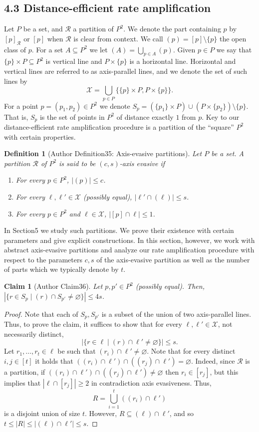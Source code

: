 \documentclass[10pt,a4paper]{article}
\newtheorem{ntdefinition}[nttheorem]{Definition}
\newtheorem{ntclaim}[nttheorem]{Claim}
\begin{document}
\subsection*{4.3 Distance-efficient rate amplification}
Let $P$ be a set, and $\mathcal R$ a partition of $P^2$. We denote the part containing $p$ by $[p]_{\mathcal R}$ or $[p]$ when $\mathcal R$ is clear from context. We call $(p)=[p]\setminus\{p\}$ the open class of $p$. For a set $A\subseteq P^2$ we let $(A)=\bigcup_{p\in A}(p)$. Given $p\in P$ we say that $\{p\}\times P\subseteq P^2$ is vertical line and $P\times\{p\}$ is a horizontal line. Horizontal and vertical lines are referred to as axis-parallel lines, and we denote the set of such lines by
\[\mathcal X=\bigcup_{p\in P}\{\{p\}\times P,P\times\{p\}\}.\]
For a point $p=(p_1,p_2)\in P^2$ we denote $S_p=(\{p_1\}\times P)\cup(P\times\{p_2\})\setminus\{p\}$. That is, $S_p$ is the set of points in $P^2$ of distance exactly $1$ from $p$. Key to our distance-efficient rate amplification procedure is a partition of the ``square'' $P^2$ with certain properties.
\setcounter{nttheorem}{34}
\begin{ntdefinition}[Author Definition35: Axis-evasive partitions]
Let $P$ be a set. A partition $\mathcal R$ of $P^2$ is said to be $(c,s)$-axis evasive if
\begin{enumerate}
\item For every $p\in P^2$, $|(p)|\leq c$.
\item For every $\ell,\ell'\in\mathcal X$ (possibly equal), $|\ell'\cap(\ell)|\leq s$.
\item For every $p\in P^2$ and $\ell\in\mathcal X$, $|[p]\cap\ell|\leq1$.
\end{enumerate}
\end{ntdefinition}
In Section5 we study such partitions. We prove their existence with certain parameters and give explicit constructions. In this section, however, we work with abstract axis-evasive partitions and analyze our rate amplification procedure with respect to the parameters $c,s$ of the axis-evasive partition as well as the number of parts which we typically denote by $t$.
\begin{ntclaim}[Author Claim36]
Let $p,p'\in P^2$ (possibly equal). Then, $|\{r\in S_p\mid(r)\cap S_{p'}\ne\varnothing\}|\leq4s$.
\end{ntclaim}
\begin{proof}
Note that each of $S_p,S_{p'}$ is a subset of the union of two axis-parallel lines. Thus, to prove the claim, it suffices to show that for every $\ell,\ell'\in\mathcal X$, not necessarily distinct,
\[|\{r\in\ell\mid(r)\cap\ell'\ne\varnothing\}|\leq s.\]
Let $r_1,\ldots,r_t\in\ell$ be such that $(r_i)\cap\ell'\ne\varnothing$. Note that for every distinct $i,j\in[t]$ it holds that $((r_i)\cap\ell')\cap((r_j)\cap\ell')=\varnothing$. Indeed, since $\mathcal R$ is a partition, if $((r_i)\cap\ell')\cap((r_j)\cap\ell')\ne\varnothing$ then $r_i\in[r_j]$, but this implies that $|\ell\cap[r_j]|\geq2$ in contradiction axis evasiveness. Thus,
\[R=\bigcup_{i=1}^t((r_i)\cap\ell')\]
is a disjoint union of size $t$. However, $R\subseteq(\ell)\cap\ell'$, and so $t\leq|R|\leq|(\ell)\cap\ell'|\leq s$.
\end{proof}
\end{document}

